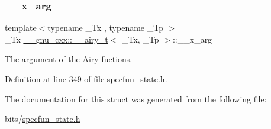 \subsubsection{\texorpdfstring{\+\_\+\+\_\+x\+\_\+arg}{\_\_x\_arg}}
{\footnotesize\ttfamily template$<$typename \+\_\+\+Tx , typename \+\_\+\+Tp $>$ \\
\+\_\+\+Tx \hyperlink{struct____gnu__cxx_1_1____airy__t}{\+\_\+\+\_\+gnu\+\_\+cxx\+::\+\_\+\+\_\+airy\+\_\+t}$<$ \+\_\+\+Tx, \+\_\+\+Tp $>$\+::\+\_\+\+\_\+x\+\_\+arg}



The argument of the Airy fuctions. 



Definition at line 349 of file specfun\+\_\+state.\+h.



The documentation for this struct was generated from the following file\+:\begin{DoxyCompactItemize}
\item 
bits/\hyperlink{specfun__state_8h}{specfun\+\_\+state.\+h}\end{DoxyCompactItemize}
